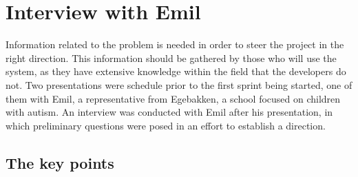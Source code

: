 \section{Interview with Emil}
Information related to the problem is needed in order to steer the project in the right direction.
This information should be gathered by those who will use the system, as they have extensive knowledge within the field that the developers do not.
Two presentations were schedule prior to the first sprint being started, one of them with Emil, a representative from Egebakken, a school focused on children with autism.
An interview was conducted with Emil after his presentation, in which preliminary questions were posed in an effort to establish a direction.

\subsection{The key points}

